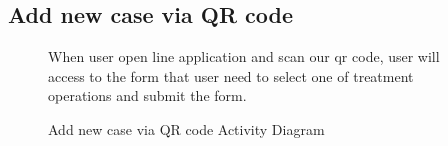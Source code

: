 \documentclass[12pt,oneside,openright,a4paper]{cpe-english-project}
\begin{document}
      \subsection{Add new case via QR code}
      \begin{figure}[!h]
        \centering
        \caption{Add new case via QR code Activity Diagram}\label{fig:AD_AddCase}
        \begin{flushleft}
          \qquad When user open line application and scan our qr code, user will access to the form that user need to select one of treatment operations and submit the form.  \par
        \end{flushleft}
      \end{figure}
\end{document}
